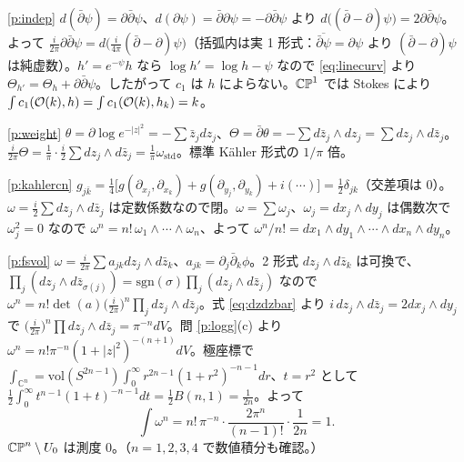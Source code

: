 \begin{sol}{\ref{p:indep}}
$d(\bar\partial\psi)=\partial\bar\partial\psi$、$d(\partial\psi)=\bar\partial\partial\psi=-\partial\bar\partial\psi$ より $d\big((\bar\partial-\partial)\psi\big)=2\partial\bar\partial\psi$。よって $\frac i{2\pi}\partial\bar\partial\psi=d\big(\frac i{4\pi}(\bar\partial-\partial)\psi\big)$（括弧内は実 1 形式：$\overline{\bar\partial\psi}=\partial\psi$ より $(\bar\partial-\partial)\psi$ は純虚数）。$h'=e^{-\psi}h$ なら $\log h'=\log h-\psi$ なので \eqref{eq:linecurv} より $\Theta_{h'}=\Theta_h+\partial\bar\partial\psi$。したがって $c_1$ は $h$ によらない。$\mathbb{CP}^1$ では Stokes により $\int c_1(\mathcal O(k),h)=\int c_1(\mathcal O(k),h_k)=k$。
\end{sol}
\begin{sol}{\ref{p:weight}}
$\theta=\partial\log e^{-|z|^2}=-\sum\bar z_jdz_j$、$\Theta=\bar\partial\theta=-\sum d\bar z_j\wedge dz_j=\sum dz_j\wedge d\bar z_j$。$\frac i{2\pi}\Theta=\frac1\pi\cdot\frac i2\sum dz_j\wedge d\bar z_j=\frac1\pi\omega_{\mathrm{std}}$。標準 Kähler 形式の $1/\pi$ 倍。
\end{sol}
\begin{sol}{\ref{p:kahlercn}}
$g_{j\bar k}=\frac14\big[g(\partial_{x_j},\partial_{x_k})+g(\partial_{y_j},\partial_{y_k})+i(\cdots)\big]=\frac12\delta_{jk}$（交差項は $0$）。$\omega=\frac i2\sum dz_j\wedge d\bar z_j$ は定数係数なので閉。$\omega=\sum\omega_j$、$\omega_j=dx_j\wedge dy_j$ は偶数次で $\omega_j^2=0$ なので $\omega^n=n!\,\omega_1\wedge\cdots\wedge\omega_n$、よって $\omega^n/n!=dx_1\wedge dy_1\wedge\cdots\wedge dx_n\wedge dy_n$。
\end{sol}
\begin{sol}{\ref{p:fsvol}}
$\omega=\frac i{2\pi}\sum a_{jk}dz_j\wedge d\bar z_k$、$a_{jk}=\partial_j\bar\partial_k\phi$。2 形式 $dz_j\wedge d\bar z_k$ は可換で、$\prod_j(dz_j\wedge d\bar z_{\sigma(j)})=\mathrm{sgn}(\sigma)\prod_j(dz_j\wedge d\bar z_j)$ なので $\omega^n=n!\det(a)\big(\frac i{2\pi}\big)^n\prod_jdz_j\wedge d\bar z_j$。式 \eqref{eq:dzdzbar} より $i\,dz_j\wedge d\bar z_j=2dx_j\wedge dy_j$ で $\big(\frac i{2\pi}\big)^n\prod dz_j\wedge d\bar z_j=\pi^{-n}dV$。問 \ref{p:logg}(c) より $\omega^n=n!\pi^{-n}(1+|z|^2)^{-(n+1)}dV$。極座標で $\int_{\mathbb C^n}=\mathrm{vol}(S^{2n-1})\int_0^\infty r^{2n-1}(1+r^2)^{-n-1}dr$、$t=r^2$ として $\frac12\int_0^\infty t^{n-1}(1+t)^{-n-1}dt=\frac12B(n,1)=\frac1{2n}$。よって
\[
\int\omega^n=n!\,\pi^{-n}\cdot\frac{2\pi^n}{(n-1)!}\cdot\frac1{2n}=1 .
\]
$\mathbb{CP}^n\setminus U_0$ は測度 $0$。（$n=1,2,3,4$ で数値積分も確認。）
\end{sol}

